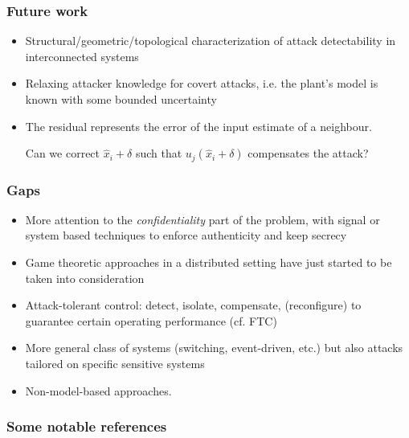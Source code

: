 \documentclass[presentation]{beamer}
\begin{document}

\begin{frame}
	\frametitle{Future work}
	\begin{itemize}
		\setlength{\itemsep}{1.5ex}
		\item<1-> Structural/geometric/topological characterization of attack detectability in interconnected systems
		
		\item<2-> Relaxing attacker knowledge for covert attacks, i.e. the plant's model is known with some bounded uncertainty
		
		\item<3> The residual represents the error of the input estimate of a neighbour.
		
		Can we correct $\hat x_i + \delta$ such that $u_j(\hat x_i + \delta)$ compensates the attack?
	\end{itemize}
\end{frame}

\begin{frame}
	\frametitle{Gaps}	
	\begin{itemize}
		\setlength{\itemsep}{1.5ex}
		\item<1-> More attention to the \emph{confidentiality} part of the problem, with signal or system based techniques to enforce authenticity and keep secrecy
		
		\item<2-> Game theoretic approaches in a distributed setting have just started to be taken into consideration
	
		\item<3-> Attack-tolerant control: detect, isolate, compensate, (reconfigure) to guarantee certain operating performance (cf. FTC)
		
		\item<4-> More general class of systems (switching, event-driven, etc.) but also attacks tailored on specific sensitive systems
		
		\item<5> Non-model-based approaches. 
	\end{itemize}
\end{frame}
 
\begin{frame}
	\frametitle{Some notable references}
	\nocite{*}
	\printbibliography
\end{frame}
\end{document}
